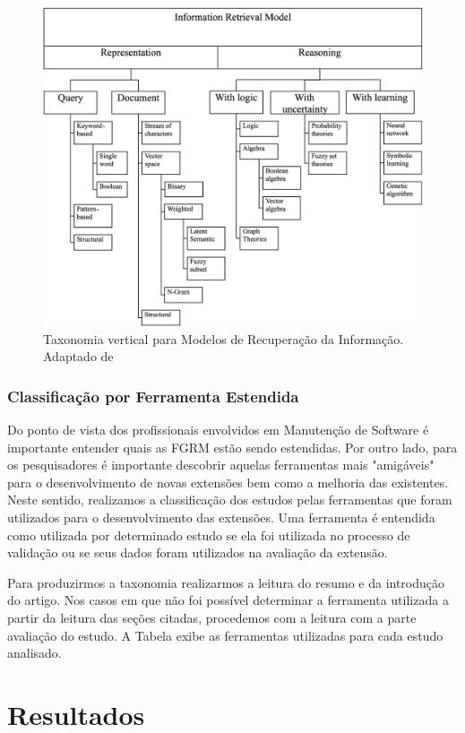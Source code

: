 \documentclass[msc]{ppgccufmg} %
\begin{document}
\begin{figure}[htpb]
	\centering
	\includegraphics[width=0.8\linewidth]{../img/information-retrieval-model.png}
	\caption{Taxonomia vertical para Modelos de Recuperação da Informação. Adaptado de \cite{cerulo2004taxonomy}}
	\label{fig:information-retrieval-model}
\end{figure}

\subsubsection{Classificação por Ferramenta Estendida}
\label{subsubsec:map-esquema-ferramenta}

Do ponto de vista dos profissionais envolvidos em Manutenção de Software é importante entender quais as FGRM estão sendo estendidas. Por outro lado, para os pesquisadores é importante descobrir aquelas ferramentas mais "amigáveis" para o desenvolvimento de novas extensões bem como a melhoria das existentes. Neste sentido, realizamos a classificação dos estudos pelas ferramentas que foram utilizados para o desenvolvimento das extensões. Uma ferramenta é entendida como utilizada por determinado estudo se ela foi utilizada no processo de validação ou se seus dados foram utilizados na avaliação da extensão. 

Para produzirmos a taxonomia realizarmos a leitura do resumo e da introdução do artigo. Nos casos em que não foi possível determinar a ferramenta utilizada a partir da leitura das seções citadas, procedemos com a leitura com a parte avaliação do estudo. A Tabela exibe as ferramentas utilizadas para cada estudo analisado.


\section{Resultados}
\label{sec:resutaldos}
\end{document}
